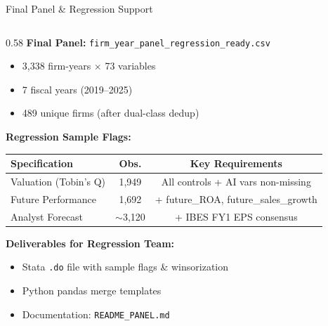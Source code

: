 \documentclass[aspectratio=169]{beamer}
\begin{document}
\begin{frame}{Final Panel \& Regression Support}

\begin{columns}[T]
\begin{column}{0.58\textwidth}
\textbf{Final Panel:} \texttt{firm\_year\_panel\_regression\_ready.csv}
\begin{itemize}
    \item 3,338 firm-years $\times$ 73 variables
    \item 7 fiscal years (2019--2025)
    \item 489 unique firms (after dual-class dedup)
\end{itemize}

\vspace{0.3cm}
\textbf{Regression Sample Flags:}
\begin{table}
\centering
\small
\begin{tabular}{@{}lcc@{}}
\toprule
\textbf{Specification} & \textbf{Obs.} & \textbf{Key Requirements} \\
\midrule
Valuation (Tobin's Q) & 1,949 & All controls + AI vars non-missing \\
Future Performance & 1,692 & + future\_ROA, future\_sales\_growth \\
Analyst Forecast & $\sim$3,120 & + IBES FY1 EPS consensus \\
\bottomrule
\end{tabular}
\end{table}

\vspace{0.3cm}
\textbf{Deliverables for Regression Team:}
\begin{itemize}
    \item Stata \texttt{.do} file with sample flags \& winsorization
    \item Python pandas merge templates
    \item Documentation: \texttt{README\_PANEL.md}
\end{itemize}
\end{column}


\end{columns}
\end{frame}
\end{document}
